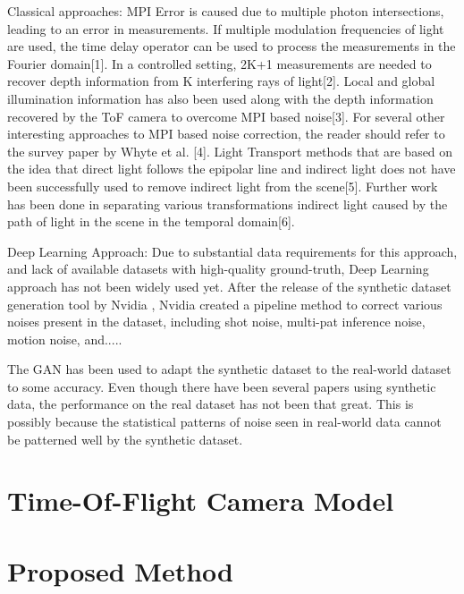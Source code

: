 \documentclass[a4paper, 11pt]{article}
\begin{document}
Classical approaches: MPI Error is caused due to multiple photon intersections, leading to an error in measurements. 
If multiple modulation frequencies of light are used, the time delay operator can be used to process the measurements in the Fourier domain[1]. 
In a controlled setting, 2K+1 measurements are needed to recover depth information from K interfering rays of light[2]. 
Local and global illumination information has also been used along with the depth information recovered by the ToF camera to overcome MPI based noise[3]. 
For several other interesting approaches to MPI based noise correction, the reader should refer to the survey paper by Whyte et al. [4]. 
Light Transport methods that are based on the idea that direct light follows the epipolar line and indirect light does not have been successfully used to remove indirect light from the scene[5]. 
Further work has been done in separating various transformations indirect light caused by the path of light in the scene in the temporal domain[6].

Deep Learning Approach: Due to substantial data requirements for this approach, and lack of available datasets with high-quality ground-truth, Deep Learning approach has not been widely used yet. 
After the release of the synthetic dataset generation tool by Nvidia \cite{guo2018flat}, Nvidia created a pipeline method to correct various noises present in the dataset, including shot noise, multi-pat inference noise, motion noise, and..... 

The GAN has been used to adapt the synthetic dataset to the real-world dataset to some accuracy.
Even though there have been several papers using synthetic data, the performance on the real dataset has not been that great. 
This is possibly because the statistical patterns of noise seen in real-world data cannot be patterned well by the synthetic dataset.

\section{Time-Of-Flight Camera Model}





\section{Proposed Method}
\end{document}
